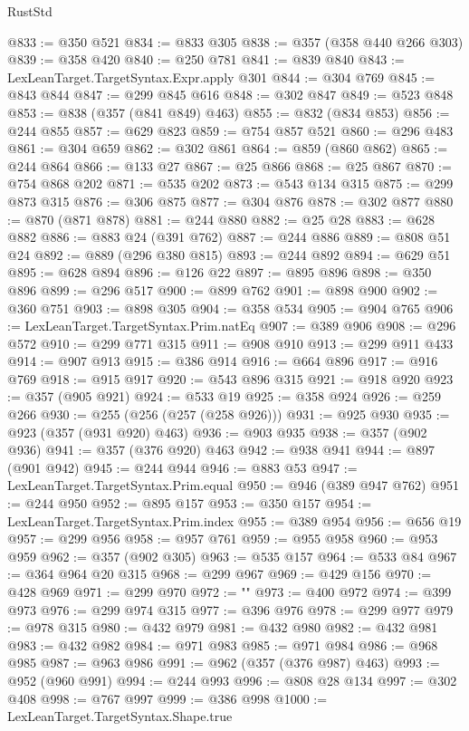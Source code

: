 \begin{lexlean}{RustStd}
\begin{coremodule}
@833 := @350 @521
@834 := @833 @305
@838 := @357 (@358 @440 @266 @303)
@839 := @358 @420
@840 := @250 @781
@841 := @839 @840
@843 := LexLeanTarget.TargetSyntax.Expr.apply @301
@844 := @304 @769
@845 := @843 @844
@847 := @299 @845 @616
@848 := @302 @847
@849 := @523 @848
@853 := @838 (@357 (@841 @849) @463)
@855 := @832 (@834 @853)
@856 := @244 @855
@857 := @629 @823
@859 := @754 @857 @521
@860 := @296 @483
@861 := @304 @659
@862 := @302 @861
@864 := @859 (@860 @862)
@865 := @244 @864
@866 := @133 @27
@867 := @25 @866
@868 := @25 @867
@870 := @754 @868 @202
@871 := @535 @202
@873 := @543 @134 @315
@875 := @299 @873 @315
@876 := @306 @875
@877 := @304 @876
@878 := @302 @877
@880 := @870 (@871 @878)
@881 := @244 @880
@882 := @25 @28
@883 := @628 @882
@886 := @883 @24 (@391 @762)
@887 := @244 @886
@889 := @808 @51 @24
@892 := @889 (@296 @380 @815)
@893 := @244 @892
@894 := @629 @51
@895 := @628 @894
@896 := @126 @22
@897 := @895 @896
@898 := @350 @896
@899 := @296 @517
@900 := @899 @762
@901 := @898 @900
@902 := @360 @751
@903 := @898 @305
@904 := @358 @534
@905 := @904 @765
@906 := LexLeanTarget.TargetSyntax.Prim.natEq
@907 := @389 @906
@908 := @296 @572
@910 := @299 @771 @315
@911 := @908 @910
@913 := @299 @911 @433
@914 := @907 @913
@915 := @386 @914
@916 := @664 @896
@917 := @916 @769
@918 := @915 @917
@920 := @543 @896 @315
@921 := @918 @920
@923 := @357 (@905 @921)
@924 := @533 @19
@925 := @358 @924
@926 := @259 @266
@930 := @255 (@256 (@257 (@258 @926)))
@931 := @925 @930
@935 := @923 (@357 (@931 @920) @463)
@936 := @903 @935
@938 := @357 (@902 @936)
@941 := @357 (@376 @920) @463
@942 := @938 @941
@944 := @897 (@901 @942)
@945 := @244 @944
@946 := @883 @53
@947 := LexLeanTarget.TargetSyntax.Prim.equal
@950 := @946 (@389 @947 @762)
@951 := @244 @950
@952 := @895 @157
@953 := @350 @157
@954 := LexLeanTarget.TargetSyntax.Prim.index
@955 := @389 @954
@956 := @656 @19
@957 := @299 @956
@958 := @957 @761
@959 := @955 @958
@960 := @953 @959
@962 := @357 (@902 @305)
@963 := @535 @157
@964 := @533 @84
@967 := @364 @964 @20 @315
@968 := @299 @967
@969 := @429 @156
@970 := @428 @969
@971 := @299 @970
@972 := ""
@973 := @400 @972
@974 := @399 @973
@976 := @299 @974 @315
@977 := @396 @976
@978 := @299 @977
@979 := @978 @315
@980 := @432 @979
@981 := @432 @980
@982 := @432 @981
@983 := @432 @982
@984 := @971 @983
@985 := @971 @984
@986 := @968 @985
@987 := @963 @986
@991 := @962 (@357 (@376 @987) @463)
@993 := @952 (@960 @991)
@994 := @244 @993
@996 := @808 @28 @134
@997 := @302 @408
@998 := @767 @997
@999 := @386 @998
@1000 := LexLeanTarget.TargetSyntax.Shape.true

\end{coremodule}
\end{lexlean}
